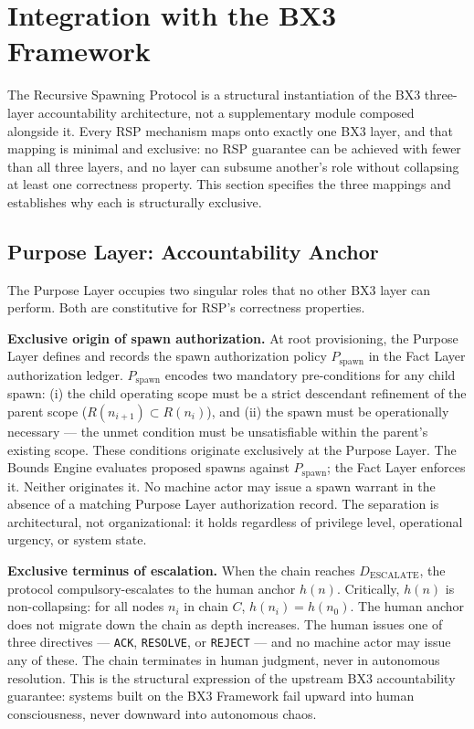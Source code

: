 \section{Integration with the BX3 Framework}
\label{sec:rs-integration}

The Recursive Spawning Protocol is a structural instantiation of the BX3 three-layer accountability architecture, not a supplementary module composed alongside it. Every RSP mechanism maps onto exactly one BX3 layer, and that mapping is minimal and exclusive: no RSP guarantee can be achieved with fewer than all three layers, and no layer can subsume another's role without collapsing at least one correctness property. This section specifies the three mappings and establishes why each is structurally exclusive.

\subsection{Purpose Layer: Accountability Anchor}
\label{sec:rs-purpose-anchor}

The Purpose Layer occupies two singular roles that no other BX3 layer can perform. Both are constitutive for RSP's correctness properties.

\medskip
\noindent\textbf{Exclusive origin of spawn authorization.} At root provisioning, the Purpose Layer defines and records the spawn authorization policy $P_{\mathrm{spawn}}$ in the Fact Layer authorization ledger. $P_{\mathrm{spawn}}$ encodes two mandatory pre-conditions for any child spawn: (i) the child operating scope must be a strict descendant refinement of the parent scope ($R(n_{i+1}) \subset R(n_i)$), and (ii) the spawn must be operationally necessary — the unmet condition must be unsatisfiable within the parent's existing scope. These conditions originate exclusively at the Purpose Layer. The Bounds Engine evaluates proposed spawns against $P_{\mathrm{spawn}}$; the Fact Layer enforces it. Neither originates it. No machine actor may issue a spawn warrant in the absence of a matching Purpose Layer authorization record. The separation is architectural, not organizational: it holds regardless of privilege level, operational urgency, or system state.

\medskip
\noindent\textbf{Exclusive terminus of escalation.} When the chain reaches $D_{\mathrm{ESCALATE}}$, the protocol compulsory-escalates to the human anchor $h(n)$. Critically, $h(n)$ is non-collapsing: for all nodes $n_i$ in chain $C$, $h(n_i) = h(n_0)$. The human anchor does not migrate down the chain as depth increases. The human issues one of three directives — \texttt{ACK}, \texttt{RESOLVE}, or \texttt{REJECT} — and no machine actor may issue any of these. The chain terminates in human judgment, never in autonomous resolution. This is the structural expression of the upstream BX3 accountability guarantee: systems built on the BX3 Framework fail upward into human consciousness, never downward into autonomous chaos.

